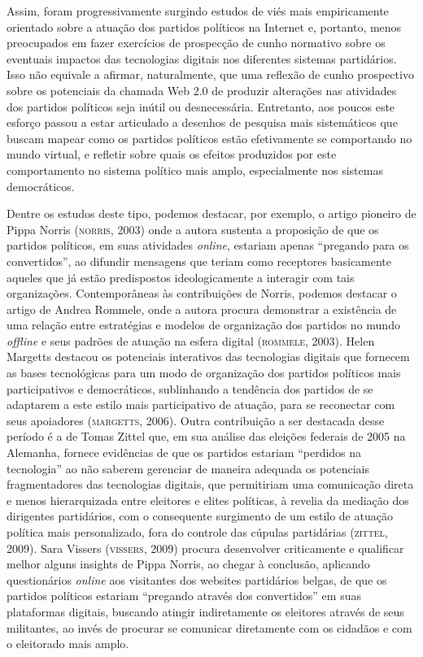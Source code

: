 Assim, foram progressivamente surgindo estudos de viés mais
empiricamente orientado sobre a atuação dos partidos políticos na
Internet e, portanto, menos preocupados em fazer exercícios de
prospecção de cunho normativo sobre os eventuais impactos das
tecnologias digitais nos diferentes sistemas partidários. Isso não
equivale a afirmar, naturalmente, que uma reflexão de cunho prospectivo
sobre os potenciais da chamada Web 2.0 de produzir alterações nas
atividades dos partidos políticos seja inútil ou desnecessária.
Entretanto, aos poucos este esforço passou a estar articulado a desenhos
de pesquisa mais sistemáticos que buscam mapear como os partidos
políticos estão efetivamente se comportando no mundo virtual, e refletir
sobre quais os efeitos produzidos por este comportamento no sistema
político mais amplo, especialmente nos sistemas democráticos.

Dentre os estudos deste tipo, podemos destacar, por exemplo, o artigo
pioneiro de Pippa Norris (\textsc{norris}, 2003) onde a autora sustenta a
proposição de que os partidos políticos, em suas atividades \emph{online},
estariam apenas ``pregando para os convertidos'', ao difundir mensagens
que teriam como receptores basicamente aqueles que já estão predispostos
ideologicamente a interagir com tais organizações. Contemporâneas às
contribuições de Norris, podemos destacar o artigo de Andrea Rommele,
onde a autora procura demonstrar a existência de uma relação entre
estratégias e modelos de organização dos partidos no mundo \emph{offline} e
seus padrões de atuação na esfera digital (\textsc{rommele}, 2003). Helen
Margetts destacou os potenciais interativos das tecnologias digitais que
fornecem as bases tecnológicas para um modo de organização dos partidos
políticos mais participativos e democráticos, sublinhando a tendência
dos partidos de se adaptarem a este estilo mais participativo de
atuação, para se reconectar com seus apoiadores (\textsc{margetts}, 2006). Outra
contribuição a ser destacada desse período é a de Tomas Zittel que, em
sua análise das eleições federais de 2005 na Alemanha, fornece
evidências de que os partidos estariam ``perdidos na tecnologia'' ao não
saberem gerenciar de maneira adequada os potenciais fragmentadores das
tecnologias digitais, que permitiriam uma comunicação direta e menos
hierarquizada entre eleitores e elites políticas, à revelia da mediação
dos dirigentes partidários, com o consequente surgimento de um estilo de
atuação política mais personalizado, fora do controle das cúpulas
partidárias (\textsc{zittel}, 2009). Sara Vissers (\textsc{vissers}, 2009) procura
desenvolver criticamente e qualificar melhor alguns insights de Pippa
Norris, ao chegar à conclusão, aplicando questionários \emph{online} aos
visitantes dos websites partidários belgas, de que os partidos políticos
estariam ``pregando através dos convertidos'' em suas plataformas
digitais, buscando atingir indiretamente os eleitores através de seus
militantes, ao invés de procurar se comunicar diretamente com os
cidadãos e com o eleitorado mais amplo.

